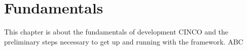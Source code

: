 
\chapter{Fundamentals}\label{ch:Basis}

This chapter is about the fundamentals of development CINCO and the preliminary steps necessary to get up and running with the framework. ABC 